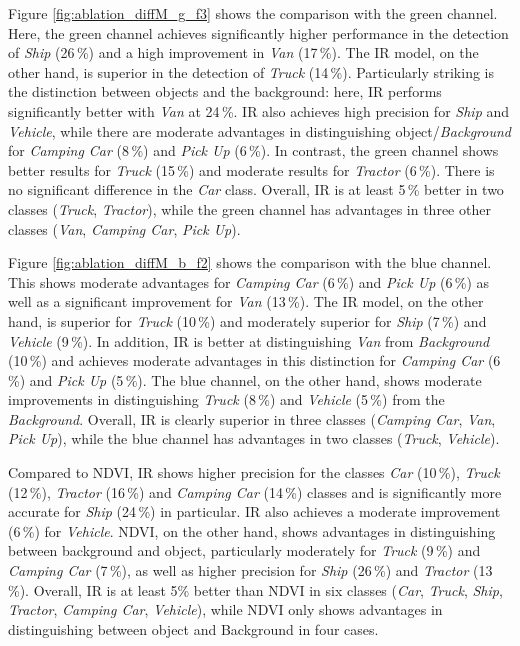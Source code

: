 Figure \ref{fig:ablation_diffM_g_f3} shows the comparison with the green channel. Here, the green channel achieves significantly higher performance in the detection of \textit{Ship} (26\,\%) and a high improvement in \textit{Van} (17\,\%). The IR model, on the other hand, is superior in the detection of \textit{Truck} (14\,\%). Particularly striking is the distinction between objects and the background: here, IR performs significantly better with \textit{Van} at 24\,\%. IR also achieves high precision for \textit{Ship} and \textit{Vehicle}, while there are moderate advantages in distinguishing object/\textit{Background} for \textit{Camping Car} (8\,\%) and \textit{Pick Up} (6\,\%). In contrast, the green channel shows better results for \textit{Truck} (15\,\%) and moderate results for \textit{Tractor} (6\,\%). There is no significant difference in the \textit{Car} class. Overall, IR is at least 5\,\% better in two classes (\textit{Truck}, \textit{Tractor}), while the green channel has advantages in three other classes (\textit{Van}, \textit{Camping Car}, \textit{Pick Up}).

Figure \ref{fig:ablation_diffM_b_f2} shows the comparison with the blue channel. This shows moderate advantages for \textit{Camping Car} (6\,\%) and \textit{Pick Up} (6\,\%) as well as a significant improvement for \textit{Van} (13\,\%). The IR model, on the other hand, is superior for \textit{Truck} (10\,\%) and moderately superior for \textit{Ship} (7\,\%) and \textit{Vehicle} (9\,\%). In addition, IR is better at distinguishing \textit{Van} from \textit{Background} (10\,\%) and achieves moderate advantages in this distinction for \textit{Camping Car} (6\,\%) and \textit{Pick Up} (5\,\%). The blue channel, on the other hand, shows moderate improvements in distinguishing \textit{Truck} (8\,\%) and \textit{Vehicle} (5\,\%) from the \textit{Background}. Overall, IR is clearly superior in three classes (\textit{Camping Car}, \textit{Van}, \textit{Pick Up}), while the blue channel has advantages in two classes (\textit{Truck}, \textit{Vehicle}).  

Compared to NDVI, IR shows higher precision for the classes \textit{Car} (10\,\%), \textit{Truck} (12\,\%), \textit{Tractor} (16\,\%) and \textit{Camping Car} (14\,\%) classes and is significantly more accurate for \textit{Ship} (24\,\%) in particular. IR also achieves a moderate improvement (6\,\%) for \textit{Vehicle}. NDVI, on the other hand, shows advantages in distinguishing between background and object, particularly moderately for \textit{Truck} (9\,\%) and \textit{Camping Car} (7\,\%), as well as higher precision for \textit{Ship} (26\,\%) and \textit{Tractor} (13\,\%). Overall, IR is at least 5\% better than NDVI in six classes (\textit{Car}, \textit{Truck}, \textit{Ship}, \textit{Tractor}, \textit{Camping Car}, \textit{Vehicle}), while NDVI only shows advantages in distinguishing between object and Background in four cases. 

